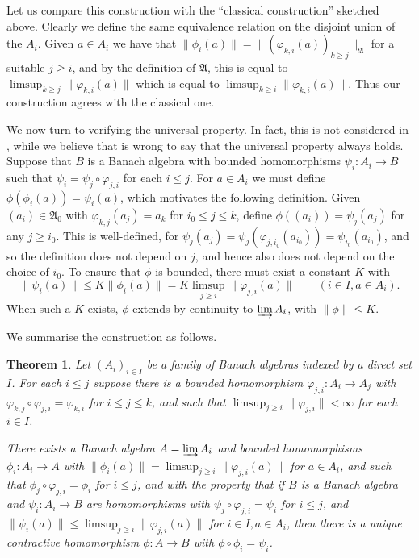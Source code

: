 \documentclass[a4paper,11pt]{article}
\newcommand{\mf}{\mathfrak}
\newcommand{\indlim}{\varinjlim}
\newtheorem{theorem}[lemma]{Theorem}
\theoremstyle{definition}
\begin{document}
Let us compare this construction with the ``classical construction'' sketched above.  Clearly we
define the same equivalence relation on the disjoint union of the $A_i$.  Given $a\in A_i$ we have
that $\|\phi_i(a)\| = \|(\varphi_{k,i}(a))_{k\geq j}\|_{\mf A}$ for a suitable $j\geq i$, and by
the definition of $\mf A$, this is equal to $\limsup_{k\geq j} \|\varphi_{k,i}(a)\|$ which is
equal to $\limsup_{k\geq i} \|\varphi_{k,i}(a)\|$.  Thus our construction agrees with the
classical one.

We now turn to verifying the universal property.  In fact, this is not considered in
\cite{blackadar}, while we believe that \cite{palmer} is wrong to say that the universal property
always holds.    Suppose that $B$ is a Banach algebra with bounded homomorphisms $\psi_i:A_i
\rightarrow B$ such that $\psi_i = \psi_j \circ \varphi_{j,i}$ for each $i\leq j$.  For $a\in A_i$
we must define $\phi(\phi_i(a)) = \psi_i(a)$, which motivates the following definition.  Given
$(a_i) \in \mf A_0$ with $\varphi_{k,j}(a_j) = a_k$ for $i_0 \leq j\leq k$, define
$\phi((a_i)) = \psi_j(a_j)$ for any $j\geq i_0$.  This is well-defined, for $\psi_j(a_j) =
\psi_j(\varphi_{j,i_0}(a_{i_0})) = \psi_{i_0}(a_{i_0})$, and so the definition does not depend on
$j$, and hence also does not depend on the choice of $i_0$.  To ensure that $\phi$ is bounded,
there must exist a constant $K$ with
\[ \|\psi_i(a)\| \leq K \|\phi_i(a)\| = K \limsup_{j\geq i} \|\varphi_{j,i}(a)\|
\qquad (i\in I, a\in A_i). \]
When such a $K$ exists, $\phi$ extends by continuity to $\indlim A_i$, with $\|\phi\|\leq K$.

We summarise the construction as follows.

\begin{theorem}\label{thm:1}
Let $(A_i)_{i\in I}$ be a family of Banach algebras indexed by a direct set $I$.  For each
$i\leq j$ suppose there is a bounded homomorphism $\varphi_{j,i}:A_i\rightarrow A_j$ with
$\varphi_{k,j} \circ \varphi_{j,i} = \varphi_{k,i}$ for $i\leq j\leq k$, and such that
$\limsup_{j\geq i} \|\varphi_{j,i}\| < \infty$ for each $i\in I$.  

There exists a Banach algebra $A=\indlim A_i$ and bounded homomorphisms $\phi_i:A_i\rightarrow
A$ with $\|\phi_i(a)\| = \limsup_{j\geq i} \|\varphi_{j,i}(a)\|$ for $a\in A_i$, and such that
$\phi_j \circ \varphi_{j,i} = \phi_i$ for $i\leq j$,
and with the property that if $B$ is a Banach algebra and
$\psi_i:A_i\rightarrow B$ are homomorphisms with $\psi_j \circ \varphi_{j,i} = \psi_i$ for
$i\leq j$, and
$\|\psi_i(a)\| \leq \limsup_{j\geq i} \|\varphi_{j,i}(a)\|$ for $i\in I, a\in A_i$, then there is
a unique contractive homomorphism $\phi:A\rightarrow B$ with $\phi\circ\phi_i = \psi_i$.
\end{theorem}
\end{document}

